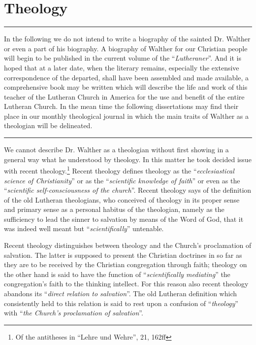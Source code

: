 \chapter{Theology}
\vspace{.15cm}
\hrule
\vspace{.30cm}
In the following we do not intend to write a biography of the sainted Dr. Walther or even a part of his biography.  A biography of Walther for our Christian people will begin to be published in the current volume of the “\textit{Lutheraner}”.  And it is hoped that at a later date, when the literary remains, especially the extensive correspondence of the departed, shall have been assembled and made available, a comprehensive book may be written which will describe the life and work of this teacher of the Lutheran Church in America for the use and benefit of the entire Lutheran Church.  In the mean time the following dissertations may find their place in our monthly theological journal in which the main traits of Walther as a theologian will be delineated.
\vspace{.10cm}
\hrule
\vspace{1.25cm}
We cannot describe Dr. Walther as a theologian without first showing in a general way what he understood by theology.  In this matter he took decided issue with recent theology.\footnote{Of the antitheses in “Lehre und Wehre”, 21, 162ff}  Recent theology defines theology as the “\textit{ecclesiastical science of Christianity}” or as the “\textit{scientific knowledge of faith}” or even as the “\textit{scientific self-consciousness of the church}”.  Recent theology says of the definition of the old Lutheran theologians, who conceived of theology in its proper sense and primary sense as a personal habitus of the theologian, namely as the sufficiency to lead the sinner to salvation by means of the Word of God, that it was indeed well meant but “\textit{scientifically}” untenable.

Recent theology distinguishes between theology and the Church’s proclamation of salvation.  The latter is supposed to present the Christian doctrines in so far as they are to be received by the Christian congregation through faith; theology on the other hand is said to have the function of “\textit{scientifically mediating}” the congregation’s faith to the thinking intellect.  For this reason also recent theology abandons its “\textit{direct relation to salvation}”.  The old Lutheran definition which consistently held to this relation is said to rest upon a confusion of “\textit{theology}” with “\textit{the Church’s proclamation of salvation}”.

